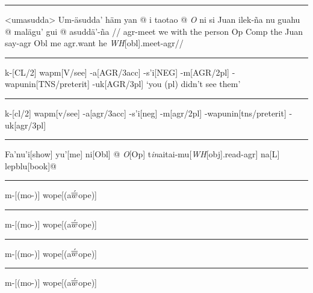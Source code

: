 \documentclass[12pt]{article}
\begin{document}
\filbreak\hrule\medskip

\begingroup
\ex[everygla=,glhangstyle=normal]<umasudda>
\begingl
\gla Um-\"asudda' h\"am yan \nogloss{$[\,$} @ i taotao \nogloss{$[\,$} @
{\it O\/} ni si Juan ilek-\~na nu guahu \nogloss{$[\,$} @ mal\"agu' gui
\nogloss{$[\,$} @
asudd\"a'-\~na \nogloss{{\it t\/}$\,]]]]$.}//
\glb agr-meet we with the person Op Comp the Juan say-agr Obl me
agr.want he {\it WH\/}[obl].meet-agr//
\endgl
\xe
\endgroup
\bigskip

\filbreak\hrule\medskip

\begingroup
\ex[glstyle=nlevel]
\begingl
k-[CL/2] wapm[V/see] -a[AGR/\sc 3acc] -s'i[NEG]
-m[AGR/\sc 2pl] -wapunin[TNS/preterit] -uk[AGR/\sc 3pl]
\glft `you (pl) didn't see them'
\endgl
\xe
\endgroup
\bigskip

\filbreak\hrule\medskip

\begingroup
\ex[glstyle=nlevel,glneveryline={\it,\sc,\sc},
   glnabovelineskip={,-2pt}]
\begingl
k-[cl/2]
wapm[v/\rm see]
-a[agr/3acc]
-s'i[neg]
-m[agr/\sc 2pl]
-wapunin[tns/preterit]
-uk[agr/3pl]
\endgl
\xe
\endgroup
\bigskip

\filbreak\hrule\medskip

\begingroup
\ex
\begingl[glstyle=nlevel,glneveryline={}]
Fa'nu'i[show]
yu'[me] ni[Obl]
\nogloss{[[\thinspace}@ {\it O}[Op]
t{\it in\/}aitai-mu[{\it WH\/}{[obj]}.read-agr]
\nogloss{{\it t}\thinspace ]}
na[L]
lepblu[book]@ \nogloss{].}
\endgl
\xe
\endgroup
\bigskip

\filbreak\hrule\medskip

\begingroup
\ex[glstyle=nlevel,glneveryline={\it}]
\gdef{}%
\begingl m-[(mo-)] wope[(a\AccentedBarredW ope)] \endgl \xe
\endgroup
\bigskip

\filbreak\hrule\medskip

\begingroup
\ex[glstyle=nlevel,glneveryline={\it},glnabovelineskip={,.5ex}]
\begingl m-[(mo-)] wope[(a\AccentedBarredW ope)] \endgl \xe
\endgroup
\bigskip

\filbreak\hrule\medskip

\begingroup
\ex[glstyle=nlevel,glneveryline={\it,\vrule height14pt width0pt}]
\begingl m-[(mo-)] wope[(a\AccentedBarredW ope)] \endgl \xe
\endgroup
\bigskip

\filbreak\hrule\medskip

\begingroup
\ex[glstyle=nlevel,glneveryline={\it},everyglword={\baselineskip=18pt}]
\begingl m-[(mo-)] wope[(a\AccentedBarredW ope)] \endgl
\xe
\endgroup
\bigskip
\end{document}
